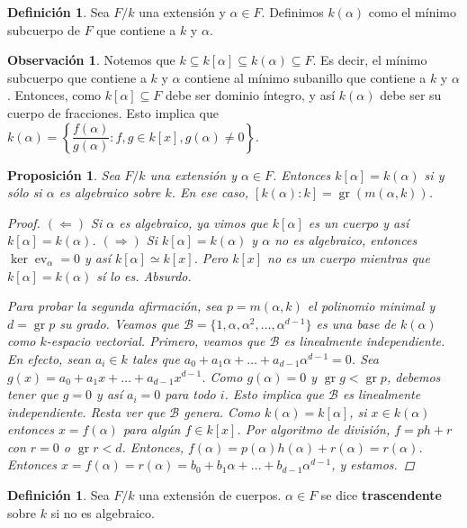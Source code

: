 \documentclass[12pt]{book}
\newtheorem{prop}[teo]{Proposición}
\theoremstyle{definition}
\newtheorem{obs}[teo]{Observación}
\newtheorem{defn}[teo]{Definición}
\DeclareMathOperator{\gr}{gr}
\DeclareMathOperator{\ev}{ev}
\begin{document}
\begin{defn}
Sea $F/k$ una extensión y $\alpha\in F$. Definimos $k(\alpha)$ como el mínimo subcuerpo de $F$ que contiene a $k$ y $\alpha$.
\end{defn}

\begin{obs}
Notemos que $k\subseteq k[\alpha]\subseteq k(\alpha)\subseteq F$. Es decir, el mínimo subcuerpo que contiene a $k$ y $\alpha$ contiene al mínimo subanillo que contiene a $k$ y $\alpha$. Entonces, como $k[\alpha]\subseteq F$ debe ser dominio íntegro, y así $k(\alpha)$ debe ser su cuerpo de fracciones. Esto implica que $k(\alpha)=\left\{\dfrac{f(\alpha)}{g(\alpha)} : f,g\in k[x], g(\alpha)\neq 0 \right\}$.
\end{obs}

\begin{prop}
Sea $F/k$ una extensión y $\alpha\in F$. Entonces $k[\alpha] = k(\alpha)$ si y sólo si $\alpha$ es algebraico sobre $k$. En ese caso, $[k(\alpha):k] = \gr(m(\alpha,k))$.
\begin{proof}
$(\Longleftarrow)$ Si $\alpha$ es algebraico, ya vimos que $k[\alpha]$ es un cuerpo y así $k[\alpha]=k(\alpha)$.
$(\Longrightarrow)$ Si $k[\alpha]=k(\alpha)$ y $\alpha$ no es algebraico, entonces $\ker\ev_\alpha =0$ y así $k[\alpha]\simeq k[x]$. Pero $k[x]$ no es un cuerpo mientras que $k[\alpha]=k(\alpha)$ sí lo es. Absurdo.

Para probar la segunda afirmación, sea $p=m(\alpha,k)$ el polinomio minimal y $d=\gr p$ su grado. Veamos que $\mathcal{B}=\{1,\alpha,\alpha^2,\ldots,  \alpha^{d-1}\}$ es una base de $k(\alpha)$ como $k$-espacio vectorial. Primero, veamos que $\mathcal{B}$ es linealmente independiente. En efecto, sean $a_i\in k$ tales que $a_0 + a_1 \alpha + \ldots + a_{d-1}\alpha^{d-1}=0$. Sea $g(x) = a_0 + a_1x + \ldots + a_{d-1}x^{d-1}$. Como $g(\alpha)=0$ y $\gr g < \gr p$, debemos tener que $g=0$ y así $a_i =0$ para todo $i$. Esto implica que $\mathcal{B}$ es linealmente independiente. Resta ver que $\mathcal{B}$ genera. Como $k(\alpha)=k[\alpha]$, si $x\in k(\alpha)$ entonces $x=f(\alpha)$ para algún $f\in k[x]$. Por algoritmo de división, $f=ph+r$ con $r=0$ o $\gr r < d$. Entonces, $f(\alpha) = p(\alpha)h(\alpha) + r(\alpha) = r(\alpha)$. Entonces $x=f(\alpha)=r(\alpha) = b_0 + b_1\alpha + \ldots + b_{d-1}\alpha^{d-1}$, y estamos.
\end{proof}
\end{prop}

\begin{defn}
Sea $F/k$ una extensión de cuerpos. $\alpha\in F$ se dice \textbf{trascendente} sobre $k$ si no es algebraico.
\end{defn}
\end{document}
